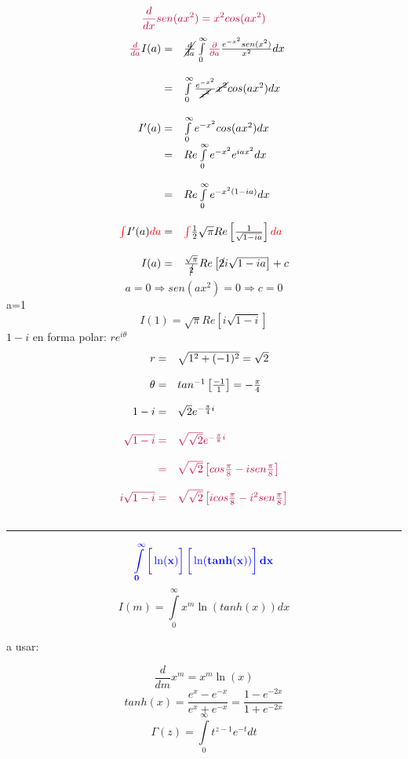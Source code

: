 \documentclass{article}
\theoremstyle{definition}
\begin{document}
\[\textcolor{purple}{\frac{d}{dx}sen(ax^2)=x^2cos(ax^2)}\]
\[
\begin{array}{rl}
	\textcolor{purple}{\frac{d}{da}}I(a)=& \cancel{\frac{d}{da}}\int\limits^{\infty}_0\textcolor{purple}{\frac{\partial}{\partial a}}\frac{e^{-x^2}sen(x^2)}{x^2}dx\\ \\
	=& \int\limits^{\infty}_0\frac{e^{-x^2}}{\cancel{x^2}}\cancel{x^2}cos(ax^2)dx\\ \\
	I'(a)=&\int\limits^{\infty}_0e^{-x^2}cos(ax^2)dx\\
	=& Re\int\limits^{\infty}_0e^{-x^2}e^{iax^2}dx\\ \\
	=& Re\int\limits^{\infty}_0e^{-x^2(1-ia)}dx\\ \\
	\textcolor{red}{\int}I'(a)\textcolor{red}{da}=&\textcolor{red}{\int}\frac{1}{2}\sqrt{\pi} Re\left[\frac{1}{\sqrt{1-ia}}\right]\textcolor{red}{da} \\ \\
	
	I(a)=& \frac{\sqrt{\pi}}{\cancel{2}}Re\left[\cancel{2}i\sqrt{1-ia}\right]+c
\end{array}
\]
\[a=0\Rightarrow sen(ax^2)=0\Rightarrow c=0\]
a=1
\[I(1)=\sqrt{\pi}Re\left[i\sqrt{1-i}\right]\]
$1-i$ en forma polar: $re^{i\theta}$
\[
\begin{array}{rl}
	r=& \sqrt{1^2+(-1)^2}=\sqrt{2}\\ \\
	\theta=& tan^{-1}\left[\frac{-1}{1}\right]=-\frac{\pi}{4}\\ \\
	1-i=& \sqrt{2}e^{-\frac{\pi}{4}i}\\ \\
	\textcolor{purple}{\sqrt{1-i}=}&\textcolor{purple}{\sqrt{\sqrt{2}}e^{-\frac{\pi}{8}i}}\\ \\
	 \textcolor{purple}{=}& \textcolor{purple}{\sqrt{\sqrt{2}}\left[cos\frac{\pi}{8}-i sen\frac{\pi}{8}\right]}\\ \\
	 \textcolor{purple}{i\sqrt{1-i}=}&\textcolor{purple}{\sqrt{\sqrt{2}}\left[icos\frac{\pi}{8}-i^2 sen\frac{\pi}{8}\right]}\\ \\
\end{array}
\]
\par\noindent\rule{\textwidth}{0.5pt}
\[\textcolor{blue}{\mathbf{\int\limits^{\infty}_0\left[\vphantom{\frac{0}{0}}\ln (x)\right]\left[\vphantom{\frac{0}{0}}\ln (tanh(x))\right]dx}}\]
\[I(m)=\int\limits^{\infty}_0x^m\ln(tanh(x))dx\]
\begin{center}
	a usar:
\end{center}
\[\frac{d}{dm}x^m=x^m\ln (x)\]
\[tanh(x)=\frac{e^x-e^{-x}}{e^x+e^{-x}}=\frac{1-e^{-2x}}{1+e^{-2x}}\]
\[\Gamma (z)=\int\limits^{\infty}_0t^{z-1}e^{-t}dt\]
\end{document}
